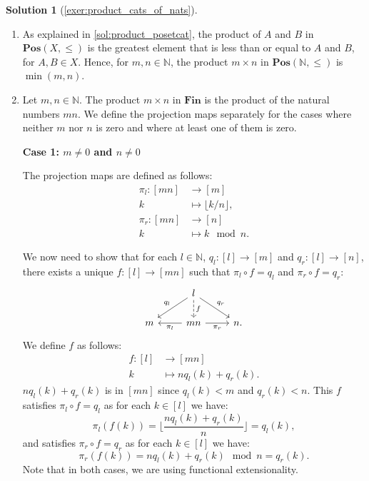 \documentclass[a4paper,11pt, oneside,titlepage=false]{scrbook}
\theoremstyle{plain}
\theoremstyle{definition}
\newtheorem{solution}[thm]{Solution}
\newcommand{\Catb}[1]{\mathbf{#1}}
\newcommand{\POS}{\Catb{Pos}}
\newcommand{\SKELFINSET}{\Catb{Fin}}
\newcommand{\projl}{\ensuremath{\pi_l}}
\newcommand{\projr}{\ensuremath{\pi_r}}
\newcommand{\NN}{\ensuremath{\mathbb{N}}}
\begin{document}
\begin{solution}[\cref{exer:product_cats_of_nats}]\label{sol:product_cats_of_nats}
	\begin{enumerate}
		\item As explained in \cref{sol:product_posetcat}, the product of $A$ and $B$ in $\POS(X,\leq)$ is the greatest element that is less than or equal to $A$ and $B$, for $A,B \in X$.
		Hence, for $m,n \in \NN$, the product $m \times n$ in $\POS(\NN,\leq)$ is $\min(m,n)$.
		\item Let $m,n \in \NN$. The product $m \times n$ in $\SKELFINSET$ is the product of the natural numbers $mn$. We define the projection maps separately for the cases where neither $m$ nor $n$ is zero and where at least one of them is zero.

		\textbf{Case 1: $m\neq 0$ and $n \neq 0$}

		The projection maps are defined as follows:
		\begin{align*}
			\pi_l : [mn] &\to [m] \\
			k &\mapsto \lfloor k / n \rfloor, \\
			\pi_r : [mn] &\to [n] \\
			k &\mapsto k \mod n.
		\end{align*}

		We now need to show that for each $l \in \NN$, $q_l : [l] \to [m]$ and $q_r : [l] \to [n]$, there exists a unique $f : [l] \to [mn]$ such that $\pi_l \circ f = q_l$ and $\pi_r \circ f = q_r$:
		\[
			\begin{tikzcd}
			  &
			  l \ar[ld, "q_l"'] \ar[rd, "q_r"] \ar[d, dashed, "f"]
			  &
			  \\
			  m
			  &
			  mn \ar[l, "\projl"] \ar[r, "\projr"']
			  &
			  n.
			\end{tikzcd}
	    \]
		We define $f$ as follows:
		\begin{align*}
			f : [l] &\to  [mn] \\
			k & \mapsto n q_l (k) + q_r(k).
		\end{align*}
		$n q_l (k) + q_r(k)$ is in $[mn]$ since $q_l(k) < m$ and $q_r(k) < n$. This $f$ satisfies $\pi_l \circ f = q_l$ as for each $k \in [l]$ we have:
		\[ \pi_l (f(k)) = \lfloor \frac{n q_l(k) + q_r(k)}{n} \rfloor = q_l(k), \]
		and satisfies $\pi_r \circ f = q_r$ as for each $k \in [l]$ we have:
		\[ \pi_r(f(k)) = n q_l(k) + q_r(k) \mod n = q_r(k). \]
		Note that in both cases, we are using functional extensionality.


\end{enumerate}
\end{solution}
\end{document}
